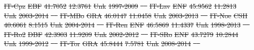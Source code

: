 \documentclass[hess, manuscript]{copernicus}
\providecommand{\DIFdeltex}[1]{{\protect\color{red}\sout{#1}}}                      %
\providecommand{\DIFdel}[1]{\texorpdfstring{\DIFdeltex{#1}}{}} %
\begin{document}
\DIFdel{IT-Cpz }%
\DIFdel{EBF }%
\DIFdel{41.7052 }%
\DIFdel{12.3761 }%
\DIFdel{Unk }%
\DIFdel{1997-2009 }%
\DIFdel{\mbox{%
\cite{IT-Cpz} }%
}%
\DIFdel{IT-Lav }%
\DIFdel{ENF }%
\DIFdel{45.9562 }%
\DIFdel{11.2813 }%
\DIFdel{Unk }%
\DIFdel{2003-2014 }%
\DIFdel{\mbox{%
\cite{IT-Lav} }%
}%
\DIFdel{IT-MBo }%
\DIFdel{GRA }%
\DIFdel{46.0147 }%
\DIFdel{11.0458 }%
\DIFdel{Unk }%
\DIFdel{2003-2013 }%
\DIFdel{\mbox{%
\cite{IT-MBo} }%
}%
\DIFdel{IT-Noe }%
\DIFdel{CSH }%
\DIFdel{40.6061 }%
\DIFdel{8.1515 }%
\DIFdel{Unk }%
\DIFdel{2004-2014 }%
\DIFdel{\mbox{%
\cite{IT-Noe} }%
}%
\DIFdel{IT-Ren }%
\DIFdel{ENF }%
\DIFdel{46.5869 }%
\DIFdel{11.4337 }%
\DIFdel{Unk }%
\DIFdel{1998-2013 }%
\DIFdel{\mbox{%
\cite{IT-Ren} }%
}%
\DIFdel{IT-Ro2 }%
\DIFdel{DBF }%
\DIFdel{42.3903 }%
\DIFdel{11.9209 }%
\DIFdel{Unk }%
\DIFdel{2002-2012 }%
\DIFdel{\mbox{%
\cite{IT-Ro2} }%
}%
\DIFdel{IT-SRo }%
\DIFdel{ENF }%
\DIFdel{43.7279 }%
\DIFdel{10.2844 }%
\DIFdel{Unk }%
\DIFdel{1999-2012 }%
\DIFdel{\mbox{%
\cite{IT-SRo} }%
}%
\DIFdel{IT-Tor }%
\DIFdel{GRA }%
\DIFdel{45.8444 }%
\DIFdel{7.5781 }%
\DIFdel{Unk }%
\DIFdel{2008-2014 }%
\DIFdel{\mbox{%
\cite{IT-Tor} }%
}%
\end{document}
